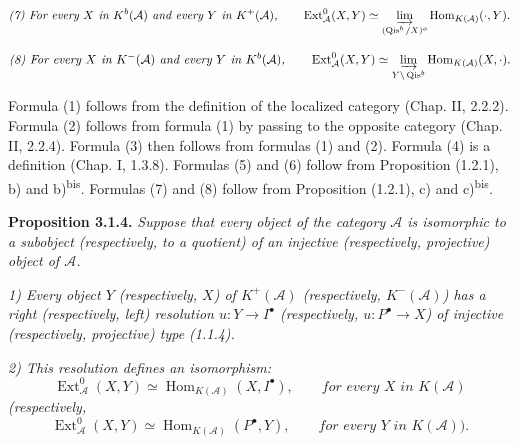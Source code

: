 \clearpage
{}%
\begingroup\small\setlength{\parskip}{0pt}\setlength{\emergencystretch}{1.5em}
\setlength{\abovedisplayskip}{4pt plus 2pt minus 2pt}%
\setlength{\belowdisplayskip}{4pt plus 2pt minus 2pt}%

\[
\textit{(7) For every $X$ in $K^{b}(\mathcal A)$ and every $Y$ in
$K^{+}(\mathcal A)$,}\qquad
\operatorname{Ext}_{\mathcal A}^{0}(X,Y)\simeq
\varinjlim_{(\operatorname{Qis}^{b}/X)^o}
\operatorname{Hom}_{K(\mathcal A)}(\mathord\cdot,Y).
\]

\[
\textit{(8) For every $X$ in $K^{-}(\mathcal A)$ and every $Y$ in
$K^{b}(\mathcal A)$,}\qquad
\operatorname{Ext}_{\mathcal A}^{0}(X,Y)\simeq
\varinjlim_{Y\backslash\operatorname{Qis}^{b}}
\operatorname{Hom}_{K(\mathcal A)}(X,\mathord\cdot).
\]

Formula (1) follows from the definition of the localized category (Chap. II,
2.2.2). Formula (2) follows from formula (1) by passing to the opposite
category (Chap. II, 2.2.4). Formula (3) then follows from formulas (1) and
(2). Formula (4) is a definition (Chap. I, 1.3.8). Formulas (5) and (6)
follow from Proposition (1.2.1), b) and b)\textsuperscript{bis}. Formulas
(7) and (8) follow from Proposition (1.2.1), c) and
c)\textsuperscript{bis}.

\medskip\noindent\textbf{Proposition 3.1.4.}\quad
\textit{Suppose that every object of the category $\mathcal A$ is isomorphic
to a subobject (respectively, to a quotient) of an injective (respectively,
projective) object of $\mathcal A$.}

\noindent\textit{1) Every object $Y$ (respectively, $X$) of
$K^{+}(\mathcal A)$ (respectively, $K^{-}(\mathcal A)$) has a right
(respectively, left) resolution $u\colon Y\longrightarrow I^\bullet$
(respectively, $u\colon P^\bullet\longrightarrow X$) of injective
(respectively, projective) type (1.1.4).}

\noindent\textit{2) This resolution defines an isomorphism:}
\[
\operatorname{Ext}_{\mathcal A}^{0}(X,Y)\simeq
\operatorname{Hom}_{K(\mathcal A)}(X,I^\bullet),
\qquad\textit{for every $X$ in $K(\mathcal A)$}
\]
\noindent\textit{(respectively,}
\[
\operatorname{Ext}_{\mathcal A}^{0}(X,Y)\simeq
\operatorname{Hom}_{K(\mathcal A)}(P^\bullet,Y),
\qquad\textit{for every $Y$ in $K(\mathcal A)$).}
\]

